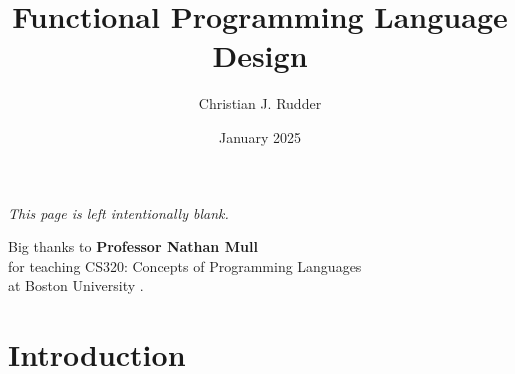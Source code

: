 \documentclass{memoir}
\title{Functional Programming Language Design}
\author{Christian J. Rudder}
\date{January 2025}
\begin{document}
\maketitle
\setcounter{tocdepth}{2}

\tableofcontents

\newpage
\thispagestyle{empty}
\mbox{}
\vfill
\begin{center}
    \textit{This page is left intentionally blank.}
\end{center}
\vfill
\newpage
\thispagestyle{empty}
\mbox{}
\vfill
\begin{center}
    \Large{Big thanks to \textbf{Professor Nathan Mull}}\\
    \normalsize 
    for teaching CS320: Concepts of Programming Languages\\
    at Boston University \cite{mull_cs320}.\\
\end{center}

\vfill

\chapter{Introduction}



\end{document}
